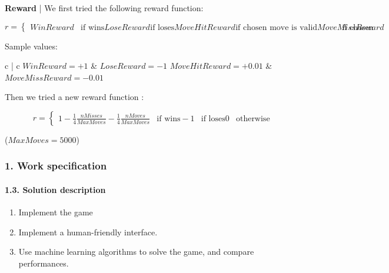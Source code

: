 \documentclass{beamer}
\def\\{}
\begin{document}
\begin{frame}

\textbf{Reward} | We first tried the following reward function:

\begin{equation*}
  r = \begin{cases}
    WinReward & \text{if wins} \\
    LoseReward & \text{if loses} \\
    MoveHitReward & \text{if chosen move is valid} \\
    MoveMissReward & \text{if chosen move is invalid}
  \end{cases}
\end{equation*}

Sample values:
\begin{center}
  \footnotesize
  \begin{tabular}{c | c}
    $WinReward = +1$ & $LoseReward=-1$ \\ \hline
    $MoveHitReward = +0.01$ & $MoveMissReward = -0.01$
  \end{tabular}
\end{center}

Then we tried a new reward function \cite{metz2020}:

\begin{equation*}
  r = \begin{cases}
    1 - \frac{1}{4}\frac{nMisses}{MaxMoves} - \frac{1}{4} \frac{nMoves}{MaxMoves} & \text{if wins} \\
    -1 & \text{if loses} \\
    0 & \text{otherwise}
  \end{cases}
\end{equation*}

($MaxMoves = 5000$)

\end{frame}

\begin{frame}
\frametitle{1. Work specification}
\framesubtitle{1.3. Solution description}

\begin{enumerate}
  \itemsep0em
  \item Implement the game
  \item Implement a human-friendly interface.
  \item Use machine learning algorithms to solve the game, and compare performances.
\end{enumerate}

\end{frame}
\end{document}

